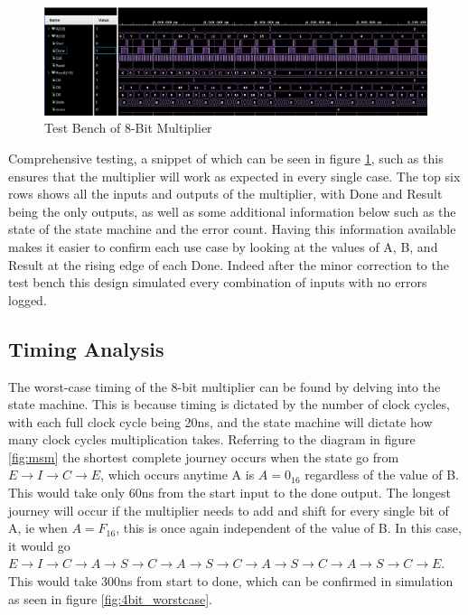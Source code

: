 \documentclass[11pt]{article}
\begin{document}
\begin{figure}        
    \centering
    \includegraphics[width=\textwidth]{8bit_test.png}
    \caption{Test Bench of 8-Bit Multiplier}
    \label{fig:4bit_testbench}
\end{figure} 

Comprehensive testing, a snippet of which can be seen in figure \ref{fig:4bit_testbench}, such as this ensures that the multiplier will work as expected in every single case.
The top six rows shows all the inputs and outputs of the multiplier, with Done and Result being the only outputs, as well as some additional information below such as the state of the state machine and the error count.
Having this information available makes it easier to confirm each use case by looking at the values of A, B, and Result at the rising edge of each Done.
Indeed after the minor correction to the test bench this design simulated every combination of inputs with no errors logged.

\subsection{Timing Analysis}

The worst-case timing of the 8-bit multiplier can be found by delving into the state machine. 
This is because timing is dictated by the number of clock cycles, with each full clock cycle being 20ns, and the state machine will dictate how many clock cycles multiplication takes.
Referring to the diagram in figure \ref{fig:msm} the shortest complete journey occurs when the state go from $E \rightarrow I \rightarrow C \rightarrow E$, which occurs anytime A is $A = 0_{16}$ regardless of the value of B.
This would take only 60ns from the start input to the done output.
The longest journey will occur if the multiplier needs to add and shift for every single bit of A, ie when $A = F_{16}$, this is once again independent of the value of B.
In this case, it would go $E \rightarrow I \rightarrow C \rightarrow A \rightarrow S \rightarrow C \rightarrow A \rightarrow S \rightarrow C \rightarrow A \rightarrow S \rightarrow C \rightarrow A \rightarrow S \rightarrow C \rightarrow E$.
This would take 300ns from start to done, which can be confirmed in simulation as seen in figure \ref{fig:4bit_worstcase}.
\end{document}
